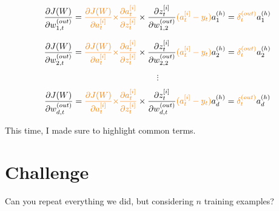 \documentclass[12pt, letterpaper]{article}
\begin{document}
\vspace{5mm} %

\[
    \frac{\partial J(W)}{\partial w_{1,t}^{(out)}} = 
    \textcolor{orange}{\frac{\partial J(W)}{\partial a_{t}^{[i]}}\times}
    \textcolor{orange}{\frac{\partial a_{t}^{[i]}}{\partial z_{t}^{[i]}}}\times
    \frac{\partial z_{t}^{[i]}}{\partial w_{1,2}^{(out)}}
    \textcolor{orange}{(a_{t}^{[i]} - y_t)}a_1^{(h)}=
    \textcolor{orange}{\delta_t^{(out)}}a_1^{(h)}
\]

\[
    \frac{\partial J(W)}{\partial w_{2,t}^{(out)}} = 
    \textcolor{orange}{\frac{\partial J(W)}{\partial a_{t}^{[i]}}\times}
    \textcolor{orange}{\frac{\partial a_{t}^{[i]}}{\partial z_{t}^{[i]}}}\times
    \frac{\partial z_{t}^{[i]}}{\partial w_{2,2}^{(out)}}
    \textcolor{orange}{(a_{t}^{[i]} - y_t)}a_2^{(h)}=
    \textcolor{orange}{\delta_t^{(out)}}a_2^{(h)}
\]

\[\vdots\]

\[
    \frac{\partial J(W)}{\partial w_{d,t}^{(out)}} = 
    \textcolor{orange}{\frac{\partial J(W)}{\partial a_{t}^{[i]}}\times}
    \textcolor{orange}{\frac{\partial a_{t}^{[i]}}{\partial z_{t}^{[i]}}} \times
    \frac{\partial z_{t}^{[i]}}{\partial w_{d,t}^{(out)}}
    \textcolor{orange}{(a_{t}^{[i]} - y_t)}a_d^{(h)}=
    \textcolor{orange}{\delta_t^{(out)}}a_d^{(h)}
\]

This time, I made sure to highlight common terms.

\section{Challenge}

Can you repeat everything we did, but considering $n$ training
examples?
\end{document}
